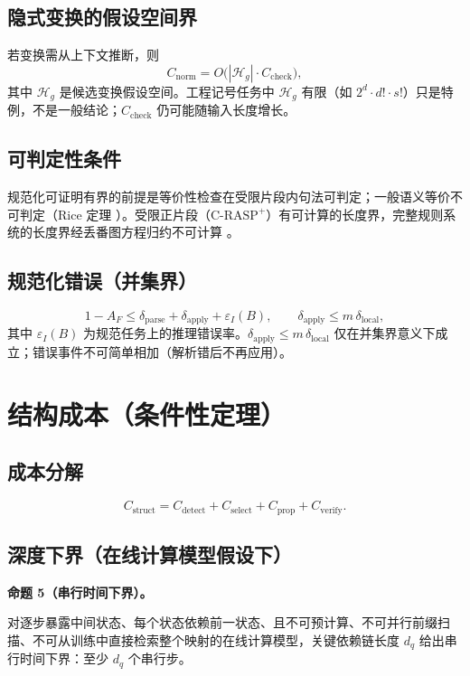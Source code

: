 \documentclass[11pt]{ctexart}
\newcommand{\named}[1]{%
  \par\vspace{6pt}\noindent\textbf{#1}\par\nopagebreak\vspace{2pt}%
}
\newcommand{\propx}[1]{\named{#1}}
\begin{document}
\subsection{隐式变换的假设空间界}

若变换需从上下文推断，则
\[
  C_{\mathrm{norm}} = O\big(|\mathcal{H}_g|\cdot C_{\mathrm{check}}\big),
\]
其中 $\mathcal{H}_g$ 是候选变换假设空间。工程记号任务中 $\mathcal{H}_g$ 有限（如 $2^d\cdot d!\cdot s!$）只是特例，不是一般结论；$C_{\mathrm{check}}$ 仍可能随输入长度增长。

\subsection{可判定性条件}

规范化可证明有界的前提是等价性检查在受限片段内句法可判定；一般语义等价不可判定（Rice 定理 \cite{symmetries}）。受限正片段（$\mathrm{C}$-$\mathrm{RASP}^+$）有可计算的长度界，完整规则系统的长度界经丢番图方程归约不可计算 \cite{lenbound}。

\subsection{规范化错误（并集界）}
\[
  1 - A_F \le \delta_{\mathrm{parse}} + \delta_{\mathrm{apply}} + \varepsilon_I(B),
  \qquad
  \delta_{\mathrm{apply}} \le m\,\delta_{\mathrm{local}},
\]
其中 $\varepsilon_I(B)$ 为规范任务上的推理错误率。$\delta_{\mathrm{apply}}\le m\,\delta_{\mathrm{local}}$ 仅在并集界意义下成立；错误事件不可简单相加（解析错后不再应用）。

\section{结构成本（条件性定理）}

\subsection{成本分解}
\[
  C_{\mathrm{struct}} = C_{\mathrm{detect}} + C_{\mathrm{select}} + C_{\mathrm{prop}} + C_{\mathrm{verify}}.
\]

\subsection{深度下界（在线计算模型假设下）}

\propx{命题 5（串行时间下界）。}对逐步暴露中间状态、每个状态依赖前一状态、且不可预计算、不可并行前缀扫描、不可从训练中直接检索整个映射的在线计算模型，关键依赖链长度 $d_q$ 给出串行时间下界：至少 $d_q$ 个串行步。
\end{document}
